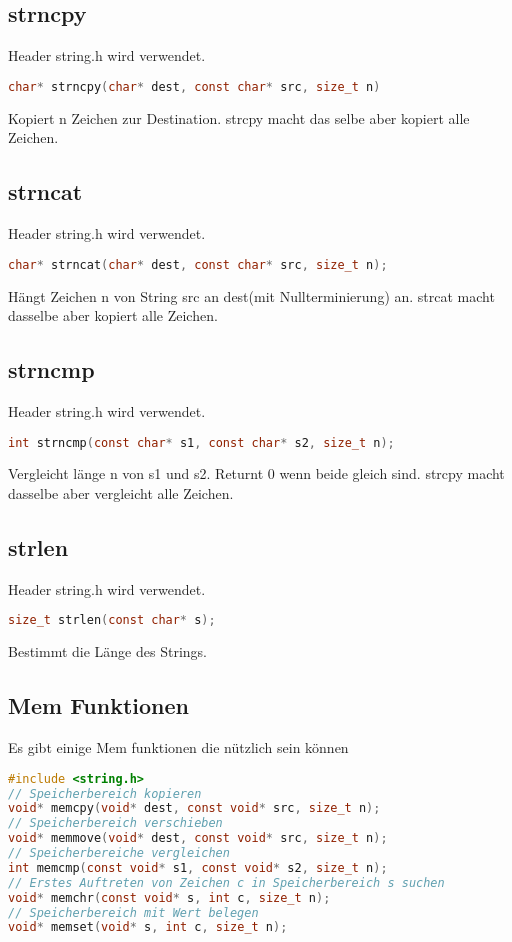 \subsection{strncpy}

Header string.h wird verwendet.\newline
\begin{lstlisting}[language = c]
char* strncpy(char* dest, const char* src, size_t n)
\end{lstlisting}
Kopiert n Zeichen zur Destination. strcpy macht das selbe aber kopiert alle Zeichen. 

\subsection{strncat}

Header string.h wird verwendet.\newline
\begin{lstlisting}[language = c]
char* strncat(char* dest, const char* src, size_t n);
\end{lstlisting}
Hängt Zeichen n von String src an dest(mit Nullterminierung) an. strcat macht dasselbe aber kopiert alle Zeichen. 

\subsection{strncmp}

Header string.h wird verwendet.\newline
\begin{lstlisting}[language = c]
int strncmp(const char* s1, const char* s2, size_t n);
\end{lstlisting}
Vergleicht länge n von s1 und s2. Returnt 0 wenn beide gleich sind. strcpy macht dasselbe aber vergleicht alle Zeichen. 

\subsection{strlen}

Header string.h wird verwendet.\newline
\begin{lstlisting}[language = c]
size_t strlen(const char* s);
\end{lstlisting}
Bestimmt die Länge des Strings. 

\subsection{Mem Funktionen}
Es gibt einige Mem funktionen die nützlich sein können
\begin{lstlisting}[language = c]
#include <string.h>
// Speicherbereich kopieren
void* memcpy(void* dest, const void* src, size_t n);
// Speicherbereich verschieben
void* memmove(void* dest, const void* src, size_t n);
// Speicherbereiche vergleichen
int memcmp(const void* s1, const void* s2, size_t n);
// Erstes Auftreten von Zeichen c in Speicherbereich s suchen
void* memchr(const void* s, int c, size_t n);
// Speicherbereich mit Wert belegen
void* memset(void* s, int c, size_t n);
\end{lstlisting}

